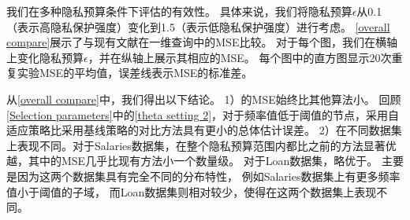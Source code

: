 我们在多种隐私预算条件下评估\myahead 的有效性。
具体来说，我们将隐私预算$\epsilon$从0.1（表示高隐私保护强度）变化到1.5（表示低隐私保护强度）进行考虑\cite{zhang2018calm, cormode2019answering}。 
\autoref{overall compare}展示了\myahead 与现有文献{\rm\parencite{cormode2019answering, wang2019answering, zhang2018calm}}在一维查询中的MSE比较。
对于每个图，我们在横轴上变化隐私预算$\epsilon$，并在纵轴上展示其相应的MSE。
每个图中的直方图显示20次重复实验MSE的平均值，误差线表示MSE的标准差。

从\autoref{overall compare}中，我们得出以下结论。
1）\myahead 的MSE始终比其他算法小。
回顾\autoref{Selection parameters}中的\autoref{theta setting 2}，对于频率值低于阈值的节点，\myahead 采用自适应策略比采用基线策略的对比方法具有更小的总体估计误差。
2）\myahead 在不同数据集上表现不同。对于Salaries数据集，\myahead 在整个隐私预算范围内都比之前的方法显著优越，其中\myahead 的MSE几乎比现有方法小一个数量级。
对于Loan数据集，\myahead 略优于\mydht。
主要是因为这两个数据集具有完全不同的分布特性，
例如Salaries数据集上有更多频率值小于阈值的子域，
而Loan数据集则相对较少，使得\myahead 在这两个数据集上表现不同。


